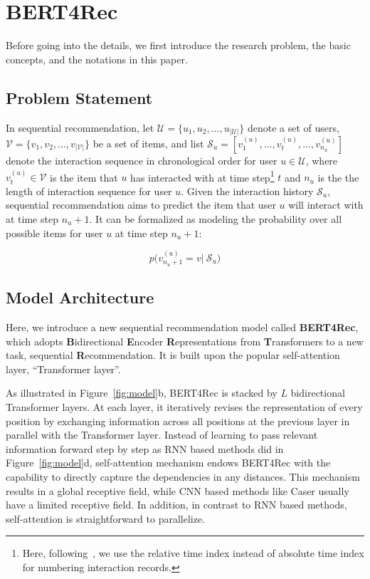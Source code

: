 \section{BERT4Rec}
Before going into the details, we first introduce the research problem, the basic concepts, and the notations in this paper.

\subsection{Problem Statement} In sequential recommendation, let $\mathcal{U}{=}\{u_1,u_2,\dots,u_{\vert\mathcal{U}\vert}\}$ denote a set of users, $\mathcal{V}{=}\{v_1,v_2,\dots,v_{|\mathcal{V}|}\}$ be a set of items, and list $\mathcal{S}_u{=}[v_1^{(u)},\dots,v_t^{(u)},\dots,v_{n_u}^{(u)}]$ denote the interaction sequence in chronological order for user $u \in \mathcal{U}$, where $v_t^{(u)} \in \mathcal{V}$ is the item that $u$ has interacted with at time step\footnote{Here, following~\cite{Rendle:WWW2010:FPM,Kang:ICDM2018:SAS}, we use the relative time index instead of absolute time index for numbering interaction records.} $t$ and $n_u$ is the the length of interaction sequence for user $u$. Given the interaction history $\mathcal{S}_u$, sequential recommendation aims to predict the item that user $u$ will interact with at time step $n_{u} + 1$. It can be formalized as modeling the probability over all possible items for user $u$ at time step $n_{u} {+} 1$:

\begin{equation*}
    p\bigl(v_{n_u+1}^{(u)}=v|\ \mathcal{S}_u\bigr)
\end{equation*}

\subsection{Model Architecture}

Here, we introduce a new sequential recommendation model called \textbf{BERT4Rec}, which adopts \textbf{B}idirectional \textbf{E}ncoder \textbf{R}epresentations from \textbf{T}ransformers to a new task, sequential \textbf{R}ecommendation.
It is built upon the popular self-attention layer, ``Transformer layer''. 

As illustrated in Figure~\ref{fig:model}b, BERT4Rec is stacked by $L$ bidirectional Transformer layers. At each layer, it iteratively revises the representation of every position by exchanging information across all positions at the previous layer in parallel with the Transformer layer. Instead of learning to pass relevant information forward step by step as RNN based methods did in Figure~\ref{fig:model}d, self-attention mechanism endows BERT4Rec with the capability to directly capture the dependencies in any distances. This mechanism results in a global receptive field, while CNN based methods like Caser usually have a limited receptive field. In addition, in contrast to RNN based methods, self-attention is straightforward to parallelize.

